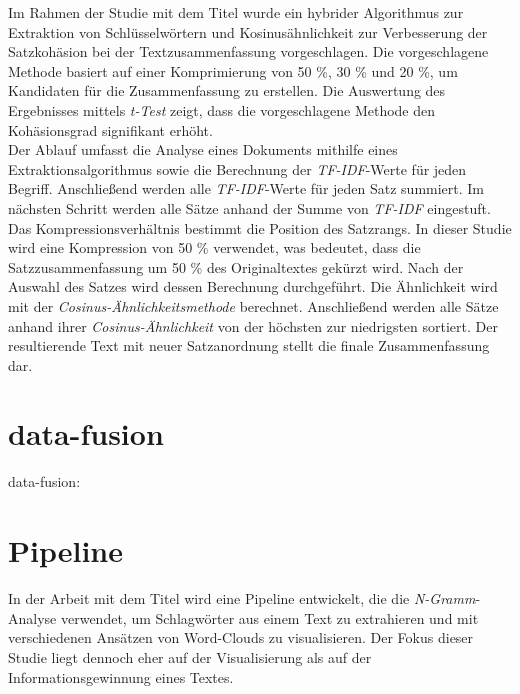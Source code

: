 Im Rahmen der Studie mit dem Titel \cite{darmawan2015hybrid} wurde ein hybrider Algorithmus zur Extraktion von Schlüsselwörtern und Kosinusähnlichkeit zur Verbesserung der Satzkohäsion bei der Textzusammenfassung vorgeschlagen. Die vorgeschlagene Methode basiert auf einer Komprimierung von 50 \%, 30 \% und 20 \%, um Kandidaten für die Zusammenfassung zu erstellen. Die Auswertung des Ergebnisses mittels \emph{t-Test} zeigt, dass die vorgeschlagene Methode den Kohäsionsgrad signifikant erhöht.\\
Der Ablauf umfasst die Analyse eines Dokuments mithilfe eines Extraktionsalgorithmus sowie die Berechnung der \emph{TF-IDF}-Werte für jeden Begriff. Anschließend werden alle \emph{TF-IDF}-Werte für jeden Satz summiert. Im nächsten Schritt werden alle Sätze anhand der Summe von \emph{TF-IDF} eingestuft. Das Kompressionsverhältnis bestimmt die Position des Satzrangs. In dieser Studie wird eine Kompression von 50 \% verwendet, was bedeutet, dass die Satzzusammenfassung um 50 \% des Originaltextes gekürzt wird. Nach der Auswahl des Satzes wird dessen Berechnung durchgeführt. Die Ähnlichkeit wird mit der \emph{Cosinus-Ähnlichkeitsmethode} berechnet. Anschließend werden alle Sätze anhand ihrer \emph{Cosinus-Ähnlichkeit} von der höchsten zur niedrigsten sortiert. Der resultierende Text mit neuer Satzanordnung stellt die finale Zusammenfassung dar.\\

\section{data-fusion}
data-fusion: \cite{famili1997data} \cite{frank2005comparing} \cite{bohne2013data}
\newpage

\section{Pipeline}
In der Arbeit mit dem Titel \cite{pirk2019implementierung} wird eine Pipeline entwickelt, die die \emph{N-Gramm}-Analyse verwendet, um Schlagwörter aus einem Text zu extrahieren und mit verschiedenen Ansätzen von Word-Clouds zu visualisieren. Der Fokus dieser Studie liegt dennoch eher auf der Visualisierung als auf der Informationsgewinnung eines Textes.\\

